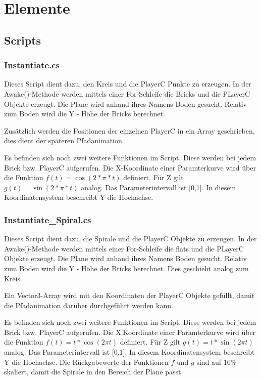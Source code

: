 \chapter{Elemente}

\section{Scripts}
\label{Scripts}

\subsection{Instantiate.cs}
\label{Instantiate}

Dieses Script dient dazu, den Kreis und die PlayerC Punkte zu erzeugen. In der Awake()-Methode werden mittels einer For-Schleife die Bricks und die PLayerC Objekte erzeugt. Die Plane wird anhand ihres Namens \glqq Boden{}\grqq{} gesucht. Relativ zum Boden wird die Y - Höhe der Bricks berechnet.

Zusätzlich werden die Positionen der einzelnen PlayerC in ein Array geschrieben, dies dient der späteren Pfadanimation.

Es befinden sich noch zwei weitere Funktionen im Script. Diese werden bei jedem Brick bzw. PlayerC aufgerufen. Die X-Koordinate einer Paramterkurve wird über die Funktion $ f(t) = \cos(2 * \pi * t) $ definiert. Für Z gilt $g(t) = \sin(2 * \pi * t)$ analog. Das Parameterintervall ist [0,1]. In diesem Koordinatensystem beschreibt Y die Hochachse.

\subsection{Instantiate\_Spiral.cs}
\label{InstantiateSpiral}

Dieses Script dient dazu, die Spirale und die PlayerC Objekte zu erzeugen. In der Awake()-Methode werden mittels einer For-Schleife die flats und die PLayerC Objekte erzeugt. Die Plane wird anhand ihres Namens \glqq Boden{}\grqq{} gesucht. Relativ zum Boden wird die Y - Höhe der Bricks berechnet. Dies geschieht analog zum Kreis.

Ein Vector3-Array wird mit den Koordinaten der PlayerC Objekte gefüllt, damit die Pfadanimation darüber durchgeführt werden kann.

Es befinden sich noch zwei weitere Funktionen im Script. Diese werden bei jedem Brick bzw. PlayerC aufgerufen. Die X.Koordinate einer Paramterkurve wird über die Funktion $ f(t) = t * \cos(2 \pi t) $ definiert. Für Z gilt $g(t) = t * \sin(2 \pi t)$ analog. Das Parameterintervall ist [0,1]. 
In diesem Koordinatensystem beschreibt Y die Hochachse.
Die Rückgabewerte der Funktionen $f$ und $g$ sind auf 10\% skaliert, damit die Spirale in den Bereich der Plane passt.

